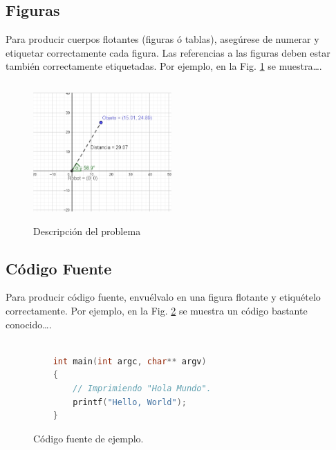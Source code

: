 \documentclass[a4paper,10pt,twocolumn]{article}
\begin{document}
	\subsection{Figuras}\label{sub:figures}
	

		Para producir cuerpos flotantes (figuras ó tablas), asegúrese de numerar
		y etiquetar correctamente cada figura. Las referencias a las figuras deben
		estar también correctamente etiquetadas. Por ejemplo, en la Fig. \ref{fig:arr}
		se muestra\ldots.

		\begin{figure}[htb]%
		\begin{center}
		\includegraphics[width=200px, height=200px]{images/problem_description.jpg}
		\end{center}
		\caption{Descripción del problema \label{fig:arr}}%
		\end{figure}

	\subsection{Código Fuente}\label{sub:listings}
		Para producir código fuente, envuélvalo en una figura flotante y
		etiquételo correctamente. Por ejemplo, en la Fig. \ref{fig:code}
		se muestra un código bastante conocido\ldots.


		\begin{figure}[htb]%
			\begin{lstlisting}[language=c]%

    int main(int argc, char** argv)
    {
        // Imprimiendo "Hola Mundo".
        printf("Hello, World");
    }

			\end{lstlisting}
		\caption{Código fuente de ejemplo.\label{fig:code}}
		\end{figure}
\end{document}
